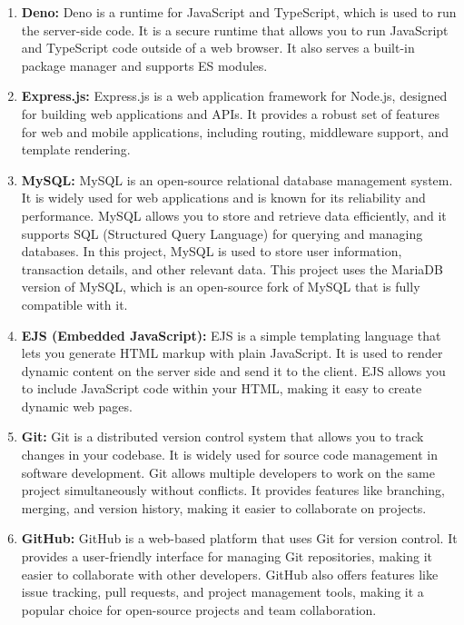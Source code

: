 \documentclass[12pt,a4paper]{report}
\begin{document}
\begin{enumerate}
    \item \textbf{Deno:}
    Deno is a runtime for JavaScript and TypeScript, which is used to run the
    server-side code. It is a secure runtime that allows you to run JavaScript
    and TypeScript code outside of a web browser. It also serves a built-in
    package manager and supports ES modules.

    \item \textbf{Express.js:}
    Express.js is a web application framework for Node.js, designed for
    building web applications and APIs. It provides a robust set of features
    for web and mobile applications, including routing, middleware support, and
    template rendering.

    \item \textbf{MySQL:}
    MySQL is an open-source relational database management system. It is widely
    used for web applications and is known for its reliability and performance.
    MySQL allows you to store and retrieve data efficiently, and it supports
    SQL (Structured Query Language) for querying and managing databases. In
    this project, MySQL is used to store user information, transaction details,
    and other relevant data. This project uses the MariaDB version of MySQL,
    which is an open-source fork of MySQL that is fully compatible with it.

    \item \textbf{EJS (Embedded JavaScript):}
    EJS is a simple templating language that lets you generate HTML markup with
    plain JavaScript. It is used to render dynamic content on the server side
    and send it to the client. EJS allows you to include JavaScript code within
    your HTML, making it easy to create dynamic web pages.

    \item \textbf{Git:}
    Git is a distributed version control system that allows you to track
    changes in your codebase. It is widely used for source code management in
    software development. Git allows multiple developers to work on the same
    project simultaneously without conflicts. It provides features like
    branching, merging, and version history, making it easier to collaborate on
    projects.

    \item \textbf{GitHub:}
    GitHub is a web-based platform that uses Git for version control. It
    provides a user-friendly interface for managing Git repositories, making it
    easier to collaborate with other developers. GitHub also offers features
    like issue tracking, pull requests, and project management tools, making it
    a popular choice for open-source projects and team collaboration.


\end{enumerate}
\end{document}
